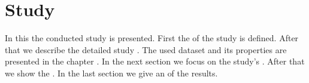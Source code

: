\chapter{Study}
\label{chp:study}

In this the conducted study is presented.
First the \textit{} of the study is defined.
After that we describe the detailed study \textit{}.
The used dataset and its properties are presented in the chapter \textit{}.
In the next section we focus on the study's \textit{}.
After that we show the \textit{}.
In the last section we give an \textit{} of the results.







